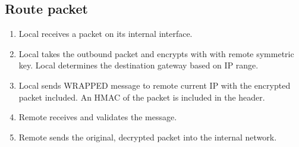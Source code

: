 \subsection{Route packet}
\label{sec:arg_protocol_route}
\begin{enumerate}
	\item Local receives a packet on its internal interface.
	\item Local takes the outbound packet and encrypts with with remote symmetric key. Local determines the destination gateway based on \ac{IP} range.
	\item Local sends WRAPPED message to remote current IP with the encrypted packet included. An \ac{HMAC} of the packet is included in the header.
	\item Remote receives and validates the message.
	\item Remote sends the original, decrypted packet into the internal network.
\end{enumerate}

